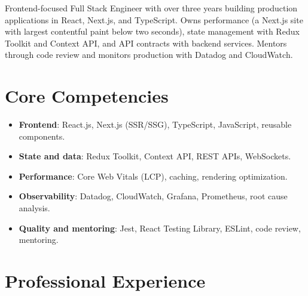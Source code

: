 \documentclass[11pt,a4paper,sans]{moderncv}
\begin{document}
\makecvtitle

\vspace{6pt}
{\small Frontend-focused Full Stack Engineer with over three years building production applications in React, Next.js, and TypeScript. Owns performance (a Next.js site with largest contentful paint below two seconds), state management with Redux Toolkit and Context API, and API contracts with backend services. Mentors through code review and monitors production with Datadog and CloudWatch.\par}

\section{Core Competencies}
\vspace{1pt}
\begin{itemize}

\item \textbf{Frontend}: React.js, Next.js (SSR/SSG), TypeScript, JavaScript, reusable components.

\item \textbf{State and data}: Redux Toolkit, Context API, REST APIs, WebSockets.

\item \textbf{Performance}: Core Web Vitals (LCP), caching, rendering optimization.

\item \textbf{Observability}: Datadog, CloudWatch, Grafana, Prometheus, root cause analysis.

\item \textbf{Quality and mentoring}: Jest, React Testing Library, ESLint, code review, mentoring.

\end{itemize}

\section{Professional Experience}
\vspace{3pt}
\end{document}
